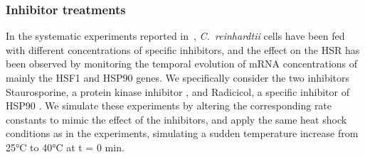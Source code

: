 \documentclass[oneside, 10pt, a4paper, twocolumn]{article}
\begin{document}
\subsubsection{Inhibitor treatments}
\label{SecFeeding}

In the systematic experiments reported in~\cite{Schmollinger2013}, \textit{C.~reinhardtii} cells have been fed
with different concentrations of specific inhibitors, and the effect on the HSR
has been observed by monitoring the temporal evolution of mRNA concentrations
of mainly the HSF1 and HSP90 genes.
We specifically consider the two inhibitors Staurosporine, a protein kinase inhibitor \cite{Karaman2008}, 
and Radicicol, a specific inhibitor of HSP90 \cite{Roe1999}. 
We simulate these experiments by altering the corresponding rate constants to mimic the effect of 
the inhibitors, and apply the same heat shock conditions as in the experiments,
simulating a sudden temperature increase from 25°C to 40°C at t = 0 min.






\end{document}
